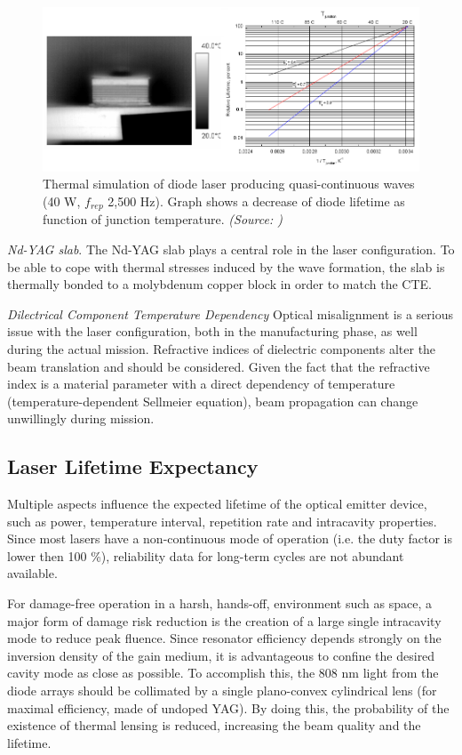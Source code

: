 \begin{figure}[ht!]
\centering
\includegraphics[scale=0.5]{chapters/img/diode_thermal.png} 
\caption{Thermal simulation of diode laser producing quasi-continuous waves (40 W, $f_{rep}$ 2,500 Hz). Graph shows a decrease of diode lifetime as function of junction temperature. \emph{(Source: \cite{thermaldiode})}}
\label{thermal_control}
\end{figure}

\textit{\acs{Nd-YAG} slab}. 
The \acs{Nd-YAG} slab plays a central role in the \acs{laser} configuration. To be able to cope with thermal stresses induced by the wave formation, the slab is thermally bonded to a molybdenum copper block in order to match the CTE.

\textit{Dilectrical Component Temperature Dependency}
Optical misalignment is a serious issue  with the \acs{laser} configuration, both in the manufacturing phase, as well during the actual mission. Refractive indices of dielectric components alter the beam translation and should be considered. Given the fact that the refractive index is a material parameter with a direct dependency of temperature (temperature-dependent Sellmeier equation), beam propagation can change unwillingly during mission. 


\subsection{ Laser Lifetime Expectancy} 
\label{opticallifetime}
Multiple aspects influence the expected lifetime of the optical emitter device, such as power, temperature interval, repetition rate and intracavity properties. Since most \acp{laser} have a non-continuous mode of operation (i.e. the duty factor is lower then 100 \%), reliability data for long-term cycles are not abundant available.  

For damage-free operation in a harsh, hands-off, environment such as space, a major form of damage risk reduction is the creation of a large single intracavity mode to reduce peak fluence. Since resonator efficiency depends strongly on the inversion density of the gain medium, it is advantageous to confine the desired cavity mode as close as possible. To accomplish this, the 808 nm light from the diode arrays should be collimated by a single plano-convex cylindrical lens (for maximal efficiency, made of undoped YAG). By doing this, the probability of the existence of thermal lensing is reduced, increasing the beam quality and the lifetime. 

